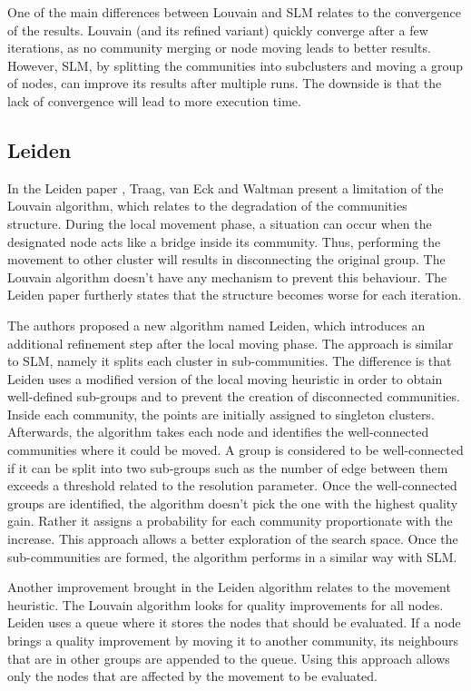 One of the main differences between Louvain and SLM relates to the convergence of the results. Louvain (and its refined variant) quickly converge after a few iterations, as no community merging or node moving leads to better results. However, SLM, by splitting the communities into subclusters and moving a group of nodes, can improve its results after multiple runs. The downside is that the lack of convergence will lead to more execution time.

\subsection{Leiden}
In the Leiden paper \cite{Traag2019a}, Traag, van Eck and Waltman present a limitation of the Louvain algorithm, which relates to the degradation of the communities structure. During the local movement phase, a situation can occur when the designated node acts like a bridge inside its community. Thus, performing the movement to other cluster will results in disconnecting the original group. The Louvain algorithm doesn't have any mechanism to prevent this behaviour. The Leiden paper furtherly states that the structure becomes worse for each iteration.

The authors proposed a new algorithm named Leiden, which introduces an additional refinement step after the local moving phase. The approach is similar to SLM, namely it splits each cluster in sub-communities. The difference is that Leiden uses a modified version of the local moving heuristic in order to obtain well-defined sub-groups and to prevent the creation of disconnected communities. Inside each community, the points are initially assigned to singleton clusters. Afterwards, the algorithm takes each node and identifies the well-connected communities where it could be moved. A group is considered to be well-connected if it can be split into two sub-groups such as the number of edge between them exceeds a threshold related to the resolution parameter. Once the well-connected groups are identified, the algorithm doesn't pick the one with the highest quality gain. Rather it assigns a probability for each community proportionate with the increase. This approach allows a better exploration of the search space. Once the sub-communities are formed, the algorithm performs in a similar way with SLM.

Another improvement brought in the Leiden algorithm relates to the movement heuristic. The Louvain algorithm looks for quality improvements for all nodes. Leiden uses a queue where it stores the nodes that should be evaluated. If a node brings a quality improvement by moving it to another community, its neighbours that are in other groups are appended to the queue. Using this approach allows only the nodes that are affected by the movement to be evaluated.

